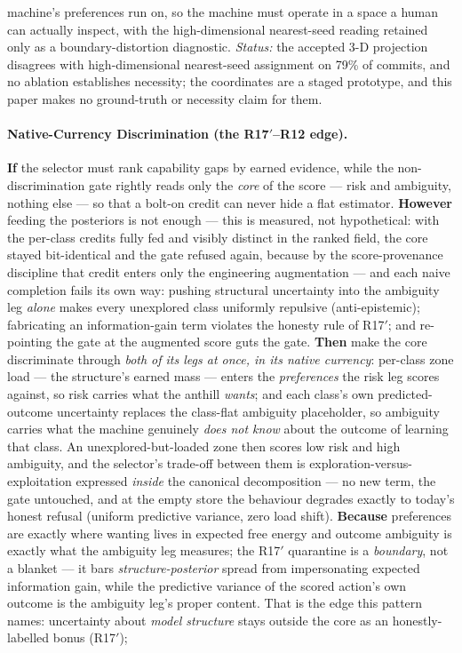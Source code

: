 machine's preferences run on, so the machine must operate in a space a human can actually inspect, with the high-dimensional nearest-seed reading retained only as a boundary-distortion diagnostic.  \emph{Status:} the accepted 3-D projection disagrees with high-dimensional nearest-seed assignment on 79\% of commits, and no ablation establishes necessity; the coordinates are a staged prototype, and this paper makes no ground-truth or necessity claim for them.

\paragraph{Native-Currency Discrimination (the R17$'$--R12 edge).} \textbf{If} the selector must rank capability gaps by earned evidence, while the non-discrimination gate rightly reads only the \emph{core} of the score --- risk and ambiguity, nothing else --- so that a bolt-on credit can never hide a flat estimator. \textbf{However} feeding the posteriors is not enough --- this is measured, not hypothetical: with the per-class credits fully fed and visibly distinct in the ranked field, the core stayed bit-identical and the gate refused again, because by the score-provenance discipline that credit enters only the engineering augmentation --- and each naive completion fails its own way: pushing structural uncertainty into the ambiguity leg \emph{alone} makes every unexplored class uniformly repulsive (anti-epistemic); fabricating an information-gain term violates the honesty rule of R17$'$; and re-pointing the gate at the augmented score guts the gate. \textbf{Then} make the core discriminate through \emph{both of its legs at once, in its native currency}: per-class zone load --- the structure's earned mass --- enters the \emph{preferences} the risk leg scores against, so risk carries what the anthill \emph{wants}; and each class's own predicted-outcome uncertainty replaces the class-flat ambiguity placeholder, so ambiguity carries what the machine genuinely \emph{does not know} about the outcome of learning that class. An unexplored-but-loaded zone then scores low risk and high ambiguity, and the selector's trade-off between them is exploration-versus-exploitation expressed \emph{inside} the canonical decomposition --- no new term, the gate untouched, and at the empty store the behaviour degrades exactly to today's honest refusal (uniform predictive variance, zero load shift). \textbf{Because} preferences are exactly where wanting lives in expected free energy and outcome ambiguity is exactly what the ambiguity leg measures; the R17$'$ quarantine is a \emph{boundary}, not a blanket --- it bars \emph{structure-posterior} spread from impersonating expected information gain, while the predictive variance of the scored action's own outcome is the ambiguity leg's proper content. That is the edge this pattern names: uncertainty about \emph{model structure} stays outside the core as an honestly-labelled bonus (R17$'$); 